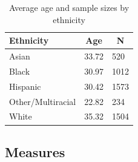 \documentclass[man]{apa6}
\begin{document}
\begin{table}[tbp]
\begin{center}
\begin{threeparttable}
\caption{\label{tab:apa table}Average age and sample sizes by ethnicity}
\begin{tabular}{lll}
\toprule
Ethnicity & \multicolumn{1}{c}{Age} & \multicolumn{1}{c}{N}\\
\midrule
Asian & 33.72 & 520\\
Black & 30.97 & 1012\\
Hispanic & 30.42 & 1573\\
Other/Multiracial & 22.82 & 234\\
White & 35.32 & 1504\\
\bottomrule
\end{tabular}
\end{threeparttable}
\end{center}
\end{table}

\subsection{Measures}\label{measures}
\end{document}
